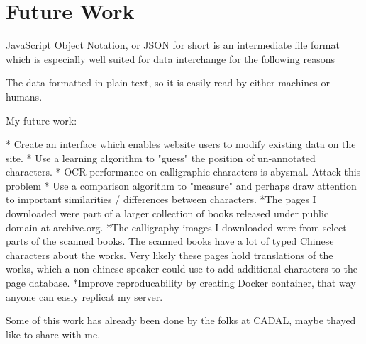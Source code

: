 \chapter{Future Work}
JavaScript Object Notation, or JSON for short is an intermediate file format which is especially well suited for data interchange for the following reasons

The data formatted in plain text, so it is easily read by either machines or humans.




My future work:
        
        *  Create an interface which enables website users to modify existing data on the site.
        *  Use a learning algorithm to "guess" the position of un-annotated characters.
        *  OCR performance on calligraphic characters is abysmal.  Attack this problem
        *  Use a comparison algorithm to "measure" and perhaps draw attention to important similarities / differences between characters.
        *The pages I downloaded were part of a larger collection of books released under public domain at archive.org.
        *The calligraphy images I downloaded were from select parts of the scanned books.  The scanned books have a lot of typed Chinese characters about the works.  Very likely these pages hold translations of the works, which a non-chinese speaker could use to add additional characters to the page database.
        *Improve reproducability by creating Docker container, that way anyone can easly replicat my server.

    Some of this work has already been done by the folks at CADAL, maybe thayed like to share with me.
